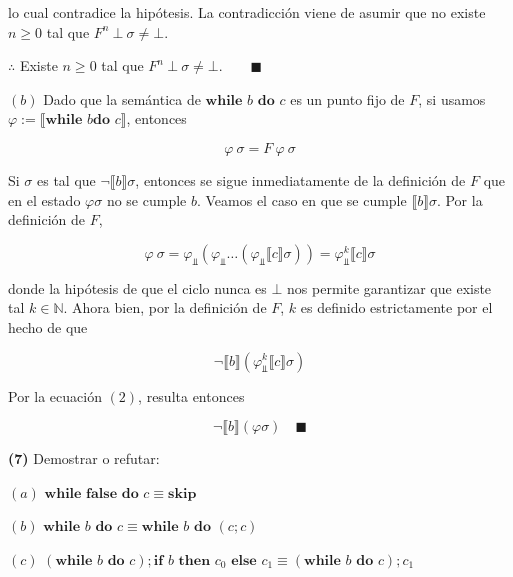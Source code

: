 \documentclass[article, 12pt]{article}
\begin{document}
lo cual contradice la hipótesis. La contradicción viene de asumir que no existe
$n \geq 0$ tal que $F^n ~ \bot  ~ \sigma \neq \bot $. 

$\therefore $ Existe $n \geq 0$ tal que $F^n ~ \bot ~ \sigma \neq \bot. \qquad
\blacksquare $

$(b)$  Dado que la semántica de $\textbf{while } b \textbf{ do } c$ es un
punto fijo de $F$, si usamos $\varphi := \llbracket \textbf{while } b \textbf{
do } c \rrbracket$, entonces

\begin{equation*}
  \varphi ~ \sigma = F ~ \varphi ~ \sigma
\end{equation*}

Si $\sigma$ es tal que $\neg \llbracket b \rrbracket\sigma$, entonces se sigue
inmediatamente de la definición de $F$ que en el estado $\varphi \sigma$ no se
cumple $b$. Veamos el caso en que se cumple $\llbracket b \rrbracket\sigma$.
Por la definición de $F$, 


\begin{equation}
  \varphi ~ \sigma = \varphi_{\Bot}\left( \varphi_{\Bot} \ldots \left(
  \varphi_{\Bot}\llbracket c \rrbracket \sigma \right)  \right) =
  \varphi_{\Bot}^k \llbracket c \rrbracket\sigma
\end{equation}

donde la hipótesis de que el ciclo nunca es $\bot$ nos permite garantizar que
existe tal $k \in \mathbb{N}$. Ahora bien, por la definición de $F$, $k$ es
definido estrictamente por el hecho de que

\begin{equation*}
  \neg \llbracket b \rrbracket( \varphi^k_{\Bot}\llbracket c \rrbracket\sigma )
\end{equation*}

Por la ecuación $(2)$, resulta entonces 

\begin{equation*}
  \neg\llbracket b \rrbracket\left( \varphi \sigma \right) \quad \blacksquare
\end{equation*}

\pagebreak 

\begin{myframe}
  \textbf{(7)} Demostrar o refutar:

  $(a)$ $\textbf{while } \textbf{false do } c \equiv \textbf{skip}$

  $(b)$ $\textbf{while } b \textbf{ do } c \equiv \textbf{while } b \textbf{ do
  } (c;c)$ 

  $(c)$  $(\textbf{while } b \textbf{ do } c); \textbf{if } b \textbf{ then }
  c_0 \textbf{ else } c_1 \equiv (\textbf{while } b \textbf{ do } c); c_1$
\end{myframe}
\end{document}

